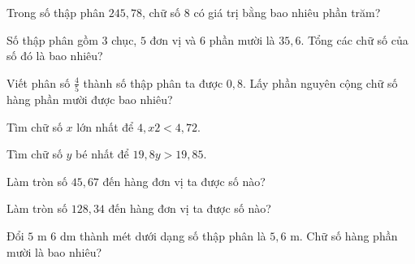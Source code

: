 
\begin{ex}
  Trong số thập phân $245{,}78$, chữ số $8$ có giá trị bằng bao nhiêu phần trăm?
\end{ex}

\begin{ex}
  Số thập phân gồm $3$ chục, $5$ đơn vị và $6$ phần mười là $35{,}6$. Tổng các chữ số của số đó là bao nhiêu?
\end{ex}

\begin{ex}
  Viết phân số $\frac{4}{5}$ thành số thập phân ta được $0{,}8$. Lấy phần nguyên cộng chữ số hàng phần mười được bao nhiêu?
\end{ex}

\begin{ex}
  Tìm chữ số $x$ lớn nhất để $4{,}x2 < 4{,}72$.
\end{ex}

\begin{ex}
  Tìm chữ số $y$ bé nhất để $19{,}8y > 19{,}85$.
\end{ex}

\begin{ex}
  Làm tròn số $45{,}67$ đến hàng đơn vị ta được số nào?
\end{ex}

\begin{ex}
  Làm tròn số $128{,}34$ đến hàng đơn vị ta được số nào?
\end{ex}

\begin{ex}
  Đổi $5\text{ m } 6\text{ dm}$ thành mét dưới dạng số thập phân là $5{,}6\text{ m}$. Chữ số hàng phần mười là bao nhiêu?
\end{ex}


